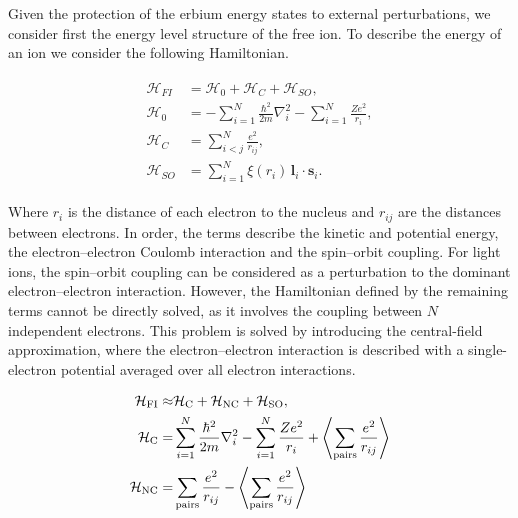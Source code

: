 Given the protection of the erbium energy states to external perturbations, we consider first the energy level structure of the free \Er ion. To describe the energy of an ion we consider the following Hamiltonian.

\begin{align}
\begin{split}
\mathcal{H}_{FI} &= \mathcal{H}_0 + \mathcal{H}_C + \mathcal{H}_{SO}, \\
\mathcal{H}_0 &= - \sum_{i=1}^N \frac{\hbar^2}{2m} \nabla_i^2 
- \sum_{i=1}^N \frac{Ze^2}{r_i}, \\
\mathcal{H}_C &= \sum_{i<j}^N \frac{e^2}{r_{ij}}, \\
\mathcal{H}_{SO} &= \sum_{i=1}^N \xi(r_i)\,\mathbf{l}_i \cdot \mathbf{s}_i.
\end{split}
\end{align}

Where $r_i$ is the distance of each electron to the nucleus and $r_{ij}$ are the distances between electrons. In order, the terms describe the kinetic and potential energy, the electron--electron Coulomb interaction and the spin--orbit coupling. For light ions, the spin--orbit coupling can be considered as a perturbation to the dominant electron--electron interaction. However, the Hamiltonian defined by the remaining terms cannot be directly solved, as it involves the coupling between $N$ independent electrons. This problem is solved by introducing the central-field approximation, where the electron--electron interaction is described with a single-electron potential averaged over all electron interactions. 

\begin{align}
\begin{split}
    \mathcal{H}_{\text{FI}} \approx& \mathcal{H}_{\text{C}} + \mathcal{H}_{\text{NC}} + \mathcal{H}_{\text{SO}}, \\
    \mathcal{H}_{\text{C}} =& \sum_{i=1}^N \frac{\hbar^2}{2m} \nabla_i^2  - \sum_{i=1}^N \frac{Ze^2}{r_i} + \left\langle\sum_{\text{pairs}} \frac{e^2}{r_{ij}}\right\rangle\\
    \mathcal{H}_{\text{NC}} =& \sum_{\text{pairs}} \frac{e^2}{r_{ij}} - \left\langle\sum_{\text{pairs}} \frac{e^2}{r_{ij}}\right\rangle
\end{split}
\end{align}


